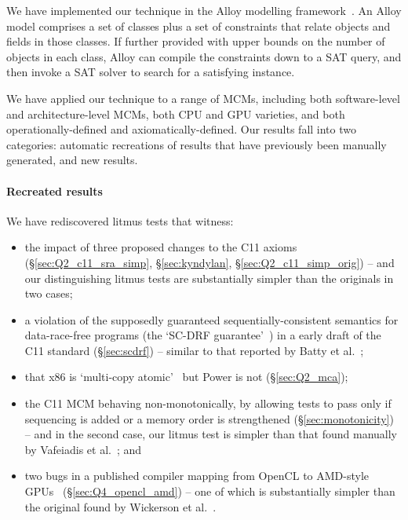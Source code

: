 We have implemented our technique in the Alloy modelling
framework~\cite{jackson12a}. An Alloy model comprises a set of
classes plus a set of constraints that relate objects and fields in
those classes. If further provided with upper bounds on the
number of objects in each class, Alloy can compile the constraints
down to a SAT query, and then invoke a SAT solver to search for a
satisfying instance.

We have applied our technique to a range of MCMs, including both
software-level and architecture-level MCMs, both CPU and GPU
varieties, and both operationally-defined and
axiomatically-defined. Our results fall into two categories: automatic
recreations of results that have previously been manually generated,
and new results.

\paragraph{Recreated results} We have rediscovered litmus tests that witness:
%
\begin{itemize}
\item the impact of three proposed changes to the C11 axioms
(\S\ref{sec:Q2_c11_sra_simp}, \S\ref{sec:kyndylan},
\S\ref{sec:Q2_c11_simp_orig}) -- and our distinguishing litmus tests
are substantially simpler than the originals in two cases;

\item a violation of the supposedly guaranteed sequentially-consistent
semantics for data-race-free programs (the `SC-DRF
guarantee'~\cite{adve+90}) in a early draft of the C11 standard
(\S\ref{sec:scdrf}) -- similar to that reported by Batty et
al.~\cite{batty+11};

\item that x86 is `multi-copy atomic'~\cite{collier92, sorin+11} but
Power is not (\S\ref{sec:Q2_mca});

\item the C11 MCM behaving non-monotonically, by allowing tests to
pass only if sequencing is added or a
memory order is strengthened (\S\ref{sec:monotonicity}) -- and in the
second case, our litmus test is simpler than that found
manually by Vafeiadis et al.~\cite{vafeiadis+15}; and

\item two bugs in a published compiler mapping from OpenCL to
AMD-style GPUs~\cite{orr+15} (\S\ref{sec:Q4_opencl_amd}) -- one of
which is substantially simpler than the original found by Wickerson et
al.~\cite{wickerson+15a}.

\end{itemize} 

